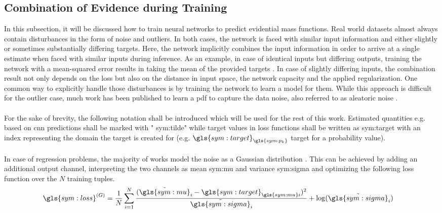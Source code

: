 \subsection{Combination of Evidence during Training}
\label{subsec:uncertainties_ev_theory}
In this subsection, it will be discussed how to train neural networks to predict evidential mass functions. Real world datasets almost always contain disturbances in the form of noise and outliers. In both cases, the network is faced with similar input information and either slightly or sometimes substantially differing targets. Here, the network implicitly combines the input information in order to arrive at a single estimate when faced with similar inputs during inference. As an example, in case of identical inputs but differing outputs, training the network with a mean-squared error results in taking the mean of the provided targets \cite{goodfellow2016deep}. In case of slightly differing inputs, the combination result not only depends on the loss but also on the distance in input space, the network capacity and the applied regularization. One common way to explicitly handle those disturbances is by training the network to learn a model for them. While this approach is difficult for the outlier case, much work has been published to learn a \gls{pdf} to capture the data noise, also referred to as aleatoric noise \cite{kendall2017uncertainties}. 
\\\\
For the sake of brevity, the following notation shall be introduced which will be used for the rest of this work. Estimated quantities e.g. based on \gls{cnn} predictions shall be marked with " \gls{sym:tilde}{\phantom{x}}" while target values in loss functions shall be written as \gls{sym:target} with an index representing the domain the target is created for (e.g. $\gls{sym:target}_{\gls{sym:p_k}}$ target for a probability value).
\\\\
In case of regression problems, the majority of works model the noise as a Gaussian distribution \cite{yang2020d3vo,feng2019leveraging,kendall2017uncertainties}. This can be achieved by adding an additional output channel, interpreting the two channels as mean \gls{sym:mu} and variance \gls{sym:sigma} and optimizing the following loss function over the $N$ training tuples.
\begin{align}
	\gls{sym:loss}^{(G)} &= \dfrac{1}{N}\sum_{i=1}^{N} \dfrac{(\tilde{\gls{sym:mu}}_i - \gls{sym:target}_{\gls{sym:mu}i})^2}{\tilde{\gls{sym:sigma}}_i}+\log(\tilde{\gls{sym:sigma}}_i)
\end{align}
